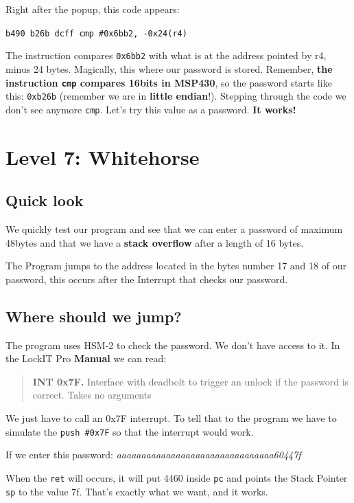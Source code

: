 \documentclass[a4paper,11pt]{article}
\begin{document}
Right after the popup, this code appears:

\texttt{b490 b26b dcff cmp \#0x6bb2, -0x24(r4)}

The instruction compares \texttt{0x6bb2} with what is at the address
pointed by r4, minus 24 bytes. Magically, this where our password is
stored. Remember, \textbf{the instruction \texttt{cmp} compares 16bits
in MSP430}, so the password starts like this: \texttt{0xb26b} (remember
we are in \textbf{little endian}!). Stepping through the code we don't
see anymore \texttt{cmp}. Let's try this value as a password. \textbf{It
works!}

\section{Level 7: Whitehorse}\label{level-7-whitehorse}

\subsection{Quick look}\label{quick-look-1}

We quickly test our program and see that we can enter a password of
maximum 48bytes and that we have a \textbf{stack overflow} after a
length of 16 bytes.

The Program jumps to the address located in the bytes number 17 and 18
of our password, this occurs after the Interrupt that checks our
password.

\subsection{Where should we jump?}\label{where-should-we-jump}

The program uses HSM-2 to check the password. We don't have access to
it. In the LockIT Pro \textbf{Manual} we can read:

\begin{quote}
\textbf{INT 0x7F.} Interface with deadbolt to trigger an unlock if the
password is correct. Takes no arguments
\end{quote}

We just have to call an 0x7F interrupt. To tell that to the program we
have to simulate the \texttt{push \#0x7F} so that the interrupt would
work.

If we enter this password: \emph{aaaaaaaaaaaaaaaaaaaaaaaaaaaaaaaa60447f}

When the \texttt{ret} will occurs, it will put 4460 inside \texttt{pc}
and points the Stack Pointer \texttt{sp} to the value 7f. That's exactly
what we want, and it works.
\end{document}
